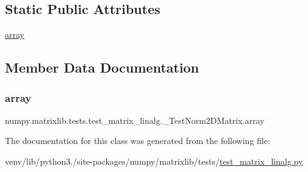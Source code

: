 \subsection*{Static Public Attributes}
\begin{DoxyCompactItemize}
\item 
\hyperlink{classnumpy_1_1matrixlib_1_1tests_1_1test__matrix__linalg_1_1__TestNorm2DMatrix_aa75ebc9f33267047fe1f4a3e62d990a9}{array}
\end{DoxyCompactItemize}


\subsection{Member Data Documentation}
\mbox{\label{classnumpy_1_1matrixlib_1_1tests_1_1test__matrix__linalg_1_1__TestNorm2DMatrix_aa75ebc9f33267047fe1f4a3e62d990a9}} 
\subsubsection{\texorpdfstring{array}{array}}
{\footnotesize\ttfamily numpy.\+matrixlib.\+tests.\+test\+\_\+matrix\+\_\+linalg.\+\_\+\+Test\+Norm2\+D\+Matrix.\+array\hspace{0.3cm}{\ttfamily [static]}}



The documentation for this class was generated from the following file\+:\begin{DoxyCompactItemize}
\item 
venv/lib/python3./site-\/packages/numpy/matrixlib/tests/\hyperlink{test__matrix__linalg_8py}{test\+\_\+matrix\+\_\+linalg.\+py}\end{DoxyCompactItemize}
